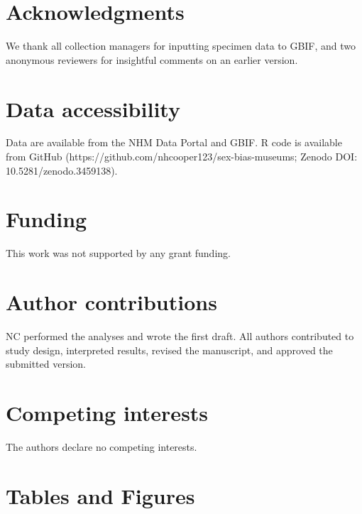 \documentclass[a4paper, 12pt]{article}
\begin{document}
\section{Acknowledgments}
We thank all collection managers for inputting specimen data to GBIF, and two anonymous reviewers for insightful comments on an earlier version.

\section{Data accessibility}\label{data-code-and-materials}
Data are available from the NHM Data Portal \cite{sex-bias-data} and GBIF\cite{gbif}. 
R code is available from GitHub (https://github.com/nhcooper123/sex-bias-museums; Zenodo DOI: 10.5281/zenodo.3459138).

\section{Funding}
This work was not supported by any grant funding.




\section{Author contributions}
NC performed the analyses and wrote the first draft. All authors contributed to study design, interpreted results, revised the manuscript, and approved the submitted version.

\section{Competing interests}
The authors declare no competing interests.

\section{Tables and Figures}
\newpage
\begin{landscape}
  
\end{landscape}
\end{document}
